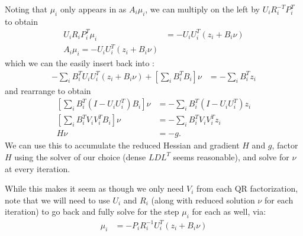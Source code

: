 Noting that $\mu_i$ only appears in  as $A_i\mu_i$, we can multiply  on the left by $U_i R_i^{-T} P_i^T$ to obtain
\begin{align}
    U_i R_i P_i^T \mu_i &= -U_i U_i^T \left(z_i + B_i\nu\right) \\
    A_i \mu_i = -U_i U_i^T \left(z_i + B_i\nu\right) \label{eq:vp_star_subproblem_qr_2}
\end{align}
which we can the easily insert back into :
\begin{align}
    -\sum_i B_i^T U_i U_i^T \left(z_i + B_i\nu\right) + \left[\sum_i B_i^T B_i\right]\nu &= -\sum_i B_i^T z_i
\end{align}
and rearrange to obtain
\begin{align}
    \left[\sum_i B_i^T \left(I - U_i U_i^T\right) B_i\right]\nu &=
        -\sum_i B_i^T \left(I - U_i U_i^T\right) z_i \\
    \left[\sum_i B_i^T V_i V_i^T B_i\right]\nu &=
        -\sum_i B_i^T V_i V_i^T z_i \\
    H\nu &= -g.
\end{align}
We can use this to accumulate the reduced Hessian and gradient $H$ and $g$, factor $H$ using the solver of our choice (dense $LDL^T$ seems reasonable), and solve for $\nu$ at every iteration.

While this makes it seem as though we only need $V_i$ from each QR factorization, note that we will need to use $U_i$ and $R_i$ (along with reduced solution $\nu$ for each iteration) to go back and fully solve for the step $\mu_i$ for each  as well, via:
\begin{align}
    \mu_i &= - P_i R_i^{-1} U_i^T \left(z_i + B_i\nu\right)
\end{align}

